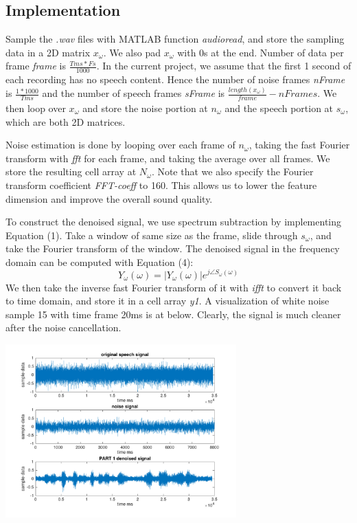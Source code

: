 \documentclass[journal]{IEEEtran}
\begin{document}
\subsection{Implementation}
\begin{flushleft}
Sample the \textit{.wav} files with MATLAB function \textit{audioread}, and store the sampling data in a 2D matrix $x_\omega$. We also pad $x_\omega$ with 0s at the end. Number of data per frame \textit{frame} is $\frac{Tms*Fs}{1000}$. In the current project, we assume that the first 1 second of each recording has no speech content. Hence the number of noise frames \textit{nFrame} is $\frac{1*1000}{Tms}$ and the number of speech frames \textit{sFrame} is $\frac{length(x_\omega)}{\textit{frame}} - \textit{nFrames}$. We then loop over $x_\omega$ and store the noise portion at $n_\omega$ and the speech portion at $s_\omega$, which are both 2D matrices. 
\end{flushleft}

\begin{flushleft}
Noise estimation is done by looping over each frame of $n_\omega$, taking the fast Fourier transform with \textit{fft} for each frame, and taking the average over all frames. We store the resulting cell array at $N_\omega$. Note that we also specify the Fourier transform coefficient \textit{FFT-coeff} to 160. This allows us to lower the feature dimension and improve the overall sound quality.
\end{flushleft}

\begin{flushleft}
To construct the denoised signal, we use spectrum subtraction by implementing Equation (1). Take a window of same size as the frame, slide through $s_\omega$, and take the Fourier transform of the window. The denoised signal in the frequency domain can be computed with Equation (4): 
\begin{equation}
Y_\omega(\omega) = |Y_\omega(\omega)|e^{j\angle S_\omega(\omega)}
\end{equation}
We then take the inverse fast Fourier transform of it with \textit{ifft} to convert it back to time domain, and store it in a cell array \textit{y1}. A visualization of white noise sample 15 with time frame 20ms is at below. Clearly, the signal is much cleaner after the noise cancellation.
\end{flushleft}
\centering 
\includegraphics[width=3.5in]{plot1}
\end{document}
